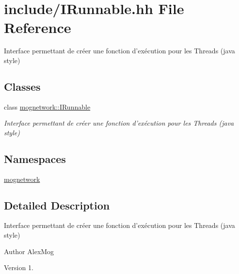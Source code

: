 \hypertarget{_i_runnable_8hh}{\section{include/\-I\-Runnable.hh File Reference}
\label{_i_runnable_8hh}
}


Interface permettant de créer une fonction d'exécution pour les Threads (java style)  


\subsection*{Classes}
\begin{DoxyCompactItemize}
\item 
class \hyperlink{classmognetwork_1_1_i_runnable}{mognetwork\-::\-I\-Runnable}
\begin{DoxyCompactList}\small\item\em Interface permettant de créer une fonction d'exécution pour les Threads (java style) \end{DoxyCompactList}\end{DoxyCompactItemize}
\subsection*{Namespaces}
\begin{DoxyCompactItemize}
\item 
\hyperlink{namespacemognetwork}{mognetwork}
\end{DoxyCompactItemize}


\subsection{Detailed Description}
Interface permettant de créer une fonction d'exécution pour les Threads (java style) \begin{DoxyAuthor}{Author}
Alex\-Mog 
\end{DoxyAuthor}
\begin{DoxyVersion}{Version}
1. 
\end{DoxyVersion}
